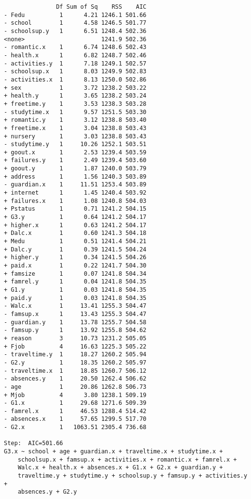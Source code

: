 \documentclass[11pt]{article}
\begin{document}
\begin{enumerate}
\begin{verbatim}
               Df Sum of Sq    RSS    AIC
- Fedu          1      4.21 1246.1 501.66
- school        1      4.58 1246.5 501.77
- schoolsup.y   1      6.51 1248.4 502.36
<none>                      1241.9 502.36
- romantic.x    1      6.74 1248.6 502.43
- health.x      1      6.82 1248.7 502.46
- activities.y  1      7.18 1249.1 502.57
- schoolsup.x   1      8.03 1249.9 502.83
- activities.x  1      8.13 1250.0 502.86
+ sex           1      3.72 1238.2 503.22
+ health.y      1      3.65 1238.2 503.24
+ freetime.y    1      3.53 1238.3 503.28
- studytime.x   1      9.57 1251.5 503.30
+ romantic.y    1      3.12 1238.8 503.40
+ freetime.x    1      3.04 1238.8 503.43
+ nursery       1      3.03 1238.8 503.43
- studytime.y   1     10.26 1252.1 503.51
+ goout.x       1      2.53 1239.4 503.59
+ failures.y    1      2.49 1239.4 503.60
+ goout.y       1      1.87 1240.0 503.79
+ address       1      1.56 1240.3 503.89
- guardian.x    1     11.51 1253.4 503.89
+ internet      1      1.45 1240.4 503.92
+ failures.x    1      1.08 1240.8 504.03
+ Pstatus       1      0.71 1241.2 504.15
+ G3.y          1      0.64 1241.2 504.17
+ higher.x      1      0.63 1241.2 504.17
+ Dalc.x        1      0.60 1241.3 504.18
+ Medu          1      0.51 1241.4 504.21
+ Dalc.y        1      0.39 1241.5 504.24
+ higher.y      1      0.34 1241.5 504.26
+ paid.x        1      0.22 1241.7 504.30
+ famsize       1      0.07 1241.8 504.34
+ famrel.y      1      0.04 1241.8 504.35
+ G1.y          1      0.03 1241.8 504.35
+ paid.y        1      0.03 1241.8 504.35
- Walc.x        1     13.41 1255.3 504.47
- famsup.x      1     13.43 1255.3 504.47
- guardian.y    1     13.78 1255.7 504.58
- famsup.y      1     13.92 1255.8 504.62
+ reason        3     10.73 1231.2 505.05
+ Fjob          4     16.63 1225.3 505.22
- traveltime.y  1     18.27 1260.2 505.94
- G2.y          1     18.35 1260.2 505.97
- traveltime.x  1     18.85 1260.7 506.12
- absences.y    1     20.50 1262.4 506.62
- age           1     20.86 1262.8 506.73
+ Mjob          4      3.80 1238.1 509.19
- G1.x          1     29.68 1271.6 509.39
- famrel.x      1     46.53 1288.4 514.42
- absences.x    1     57.65 1299.5 517.70
- G2.x          1   1063.51 2305.4 736.68

Step:  AIC=501.66
G3.x ~ school + age + guardian.x + traveltime.x + studytime.x + 
    schoolsup.x + famsup.x + activities.x + romantic.x + famrel.x + 
    Walc.x + health.x + absences.x + G1.x + G2.x + guardian.y + 
    traveltime.y + studytime.y + schoolsup.y + famsup.y + activities.y + 
    absences.y + G2.y


\end{verbatim}
\end{enumerate}
\end{document}
